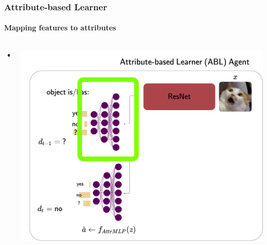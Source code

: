 \documentclass[9pt]{beamer}
\begin{document}
\begin{frame}
\frametitle{Attribute-based Learner}
\framesubtitle{Mapping features to attributes}
\begin{columns}[T]
	\begin{column}{.5\textwidth}
		\begin{itemize}
			\item
		\end{itemize}
	\end{column}
	\begin{column}{.5\textwidth}
			\includegraphics[width=\textwidth]{images/urdtc_parts_attrMLP.pdf}
	\end{column}
\end{columns}
\end{frame}
\end{document}
